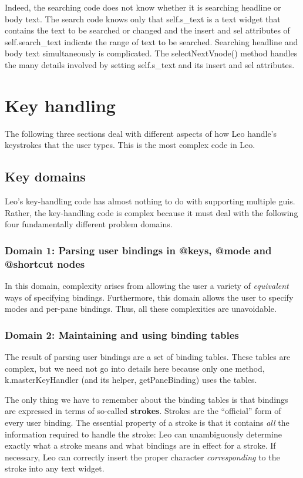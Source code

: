 \documentclass[a4paper,10pt,english]{sphinxmanual}
\begin{document}
Indeed, the searching code does not know whether it is searching headline or
body text. The search code knows only that self.s\_text is a text widget that
contains the text to be searched or changed and the insert and sel attributes
of self.search\_text indicate the range of text to be searched. Searching
headline and body text simultaneously is complicated. The selectNextVnode()
method handles the many details involved by setting self.s\_text and its insert
and sel attributes.


\section{Key handling}
\label{theory:key-handling}
The following three sections deal with different aspects of how Leo handle's
keystrokes that the user types. This is the most complex code in Leo.


\subsection{Key domains}
\label{theory:key-domains}
Leo's key-handling code has almost nothing to do with supporting multiple guis.
Rather, the key-handling code is complex because it must deal with the following
four fundamentally different problem domains.


\subsubsection{Domain 1: Parsing user bindings in @keys, @mode and @shortcut nodes}
\label{theory:domain-1-parsing-user-bindings-in-keys-mode-and-shortcut-nodes}
In this domain, complexity arises from allowing the user a variety of
\emph{equivalent} ways of specifying bindings. Furthermore, this domain allows the
user to specify modes and per-pane bindings. Thus, all these complexities are
unavoidable.


\subsubsection{Domain 2: Maintaining and using binding tables}
\label{theory:domain-2-maintaining-and-using-binding-tables}
The result of parsing user bindings are a set of binding tables. These tables
are complex, but we need not go into details here because only one method,
k.masterKeyHandler (and its helper, getPaneBinding) uses the tables.

The only thing we have to remember about the binding tables is that bindings are
expressed in terms of so-called \textbf{strokes}.  Strokes are the ``official'' form of
every user binding.  The essential property of a stroke is that it contains
\emph{all} the information required to handle the stroke: Leo can unambiguously
determine exactly what a stroke means and what bindings are in effect for a
stroke.  If necessary, Leo can correctly insert the proper character
\emph{corresponding} to the stroke into any text widget.
\end{document}
